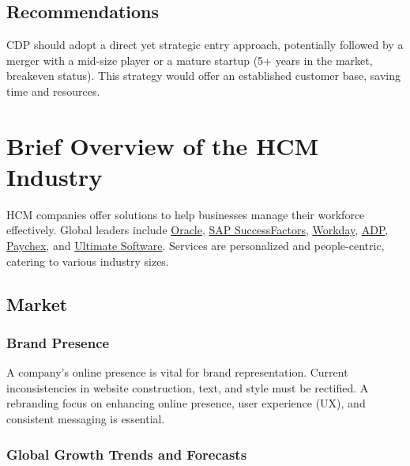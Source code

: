 \documentclass[
  a4paper,
]{book}
\begin{document}
\hypertarget{recommendations}{%
\section{Recommendations}\label{recommendations}}

CDP should adopt a direct yet strategic entry approach, potentially
followed by a merger with a mid-size player or a mature startup (5+
years in the market, breakeven status). This strategy would offer an
established customer base, saving time and resources.

\hypertarget{brief-overview-of-the-hcm-industry}{%
\chapter{Brief Overview of the HCM
Industry}\label{brief-overview-of-the-hcm-industry}}

HCM companies offer solutions to help businesses manage their workforce
effectively. Global leaders include
\href{https://www.oracle.com/}{Oracle},
\href{https://www.sap.com/products/human-resources-hcm.html}{SAP
SuccessFactors}, \href{https://www.workday.com/}{Workday},
\href{https://www.adp.com/}{ADP},
\href{https://www.paychex.com/}{Paychex}, and
\href{https://www.ultimatesoftware.com/}{Ultimate Software}. Services
are personalized and people-centric, catering to various industry sizes.

\hypertarget{market}{%
\section{Market}\label{market}}

\hypertarget{brand-presence}{%
\subsection{Brand Presence}\label{brand-presence}}

A company's online presence is vital for brand representation. Current
inconsistencies in website construction, text, and style must be
rectified. A rebranding focus on enhancing online presence, user
experience (UX), and consistent messaging is essential.

\hypertarget{global-growth-trends-and-forecasts}{%
\subsection{Global Growth Trends and
Forecasts}\label{global-growth-trends-and-forecasts}}
\end{document}
